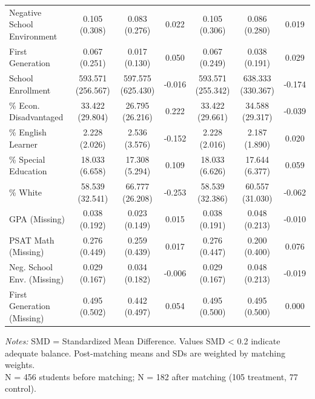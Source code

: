 \begin{table}[t]
\begin{tabular*}{\linewidth}{@{\extracolsep{\fill}}lcccccc}
Negative School Environment & 0.105 (0.308) & 0.083 (0.276) & 0.022 & 0.105 (0.306) & 0.086 (0.280) & 0.019 \\ 
First Generation & 0.067 (0.251) & 0.017 (0.130) & 0.050 & 0.067 (0.249) & 0.038 (0.191) & 0.029 \\ 
School Enrollment & 593.571 (256.567) & 597.575 (625.430) & -0.016 & 593.571 (255.342) & 638.333 (330.367) & -0.174 \\ 
\% Econ. Disadvantaged & 33.422 (29.804) & 26.795 (26.216) & 0.222 & 33.422 (29.661) & 34.588 (29.317) & -0.039 \\ 
\% English Learner & 2.228 (2.026) & 2.536 (3.576) & -0.152 & 2.228 (2.016) & 2.187 (1.890) & 0.020 \\ 
\% Special Education & 18.033 (6.658) & 17.308 (5.294) & 0.109 & 18.033 (6.626) & 17.644 (6.377) & 0.059 \\ 
\% White & 58.539 (32.541) & 66.777 (26.208) & -0.253 & 58.539 (32.386) & 60.557 (31.030) & -0.062 \\ 
{GPA (Missing)} & {0.038 (0.192)} & {0.023 (0.149)} & {0.015} & {0.038 (0.191)} & {0.048 (0.213)} & {-0.010} \\ 
PSAT Math (Missing) & 0.276 (0.449) & 0.259 (0.439) & 0.017 & 0.276 (0.447) & 0.200 (0.400) & 0.076 \\ 
Neg. School Env. (Missing) & 0.029 (0.167) & 0.034 (0.182) & -0.006 & 0.029 (0.167) & 0.048 (0.213) & -0.019 \\ 
{First Generation (Missing)} & {0.495 (0.502)} & {0.442 (0.497)} & {0.054} & {0.495 (0.500)} & {0.495 (0.500)} & {0.000} \\ 
\bottomrule
\end{tabular*}
\begin{minipage}{\linewidth}
\vspace{.05em}
\emph{Notes:} SMD = Standardized Mean Difference. Values \textbar{}SMD\textbar{} \textless{} 0.2 indicate adequate balance. Post-matching means and SDs are weighted by matching weights.\\
N = 456 students before matching; N = 182 after matching (105 treatment, 77 control).\\
\end{minipage}
\end{table}

